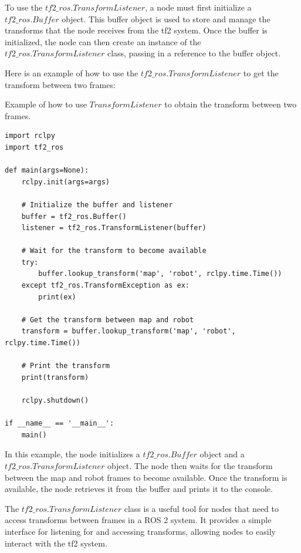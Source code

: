 \documentclass[12pt,oneside]{article}
\begin{document}
To use the $tf2\_ros.TransformListener$, a node must first initialize a $tf2\_ros.Buffer$ object. This buffer object is used to store and manage the transforms that the node receives from the tf2 system. Once the buffer is initialized, the node can then create an instance of the $tf2\_ros.TransformListener$ class, passing in a reference to the buffer object.

Here is an example of how to use the $tf2\_ros.TransformListener$ to get the transform between two frames:
\begin{listing}
\caption{Example of how to use $TransformListener$ to obtain the transform between two frames.}
\label{code:transformliseter}
\begin{tcolorbox}[]
\begin{verbatim}
import rclpy
import tf2_ros

def main(args=None):
    rclpy.init(args=args)

    # Initialize the buffer and listener
    buffer = tf2_ros.Buffer()
    listener = tf2_ros.TransformListener(buffer)

    # Wait for the transform to become available
    try:
        buffer.lookup_transform('map', 'robot', rclpy.time.Time())
    except tf2_ros.TransformException as ex:
        print(ex)

    # Get the transform between map and robot
    transform = buffer.lookup_transform('map', 'robot', rclpy.time.Time())

    # Print the transform
    print(transform)

    rclpy.shutdown()

if __name__ == '__main__':
    main()

\end{verbatim}
\end{tcolorbox}
\end{listing} 

In this example, the node initializes a $tf2\_ros.Buffer$ object and a \\ $tf2\_ros.TransformListener$ object. The node then waits for the transform between the map and robot frames to become available. Once the transform is available, the node retrieves it from the buffer and prints it to the console.

The $tf2\_ros.TransformListener$ class is a useful tool for nodes that need to access transforms between frames in a ROS 2 system. It provides a simple interface for listening for and accessing transforms, allowing nodes to easily interact with the tf2 system.
\end{document}
